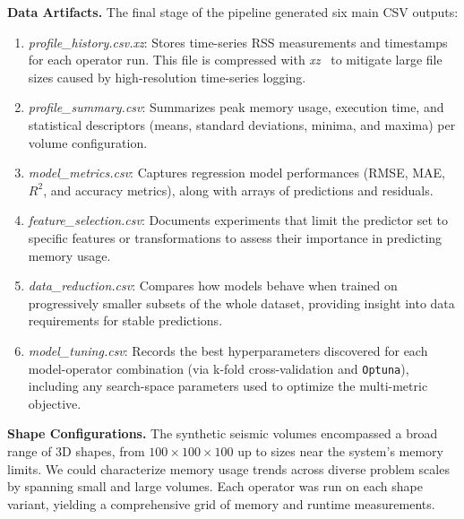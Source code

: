 \vspace{1em}
\noindent
\textbf{Data Artifacts.}
The final stage of the pipeline generated six main \ac{CSV} outputs:
\begin{enumerate}
    \item \emph{profile\_history.csv.xz}: Stores time-series \ac{RSS} measurements and timestamps for each operator run. This file is compressed with \emph{xz}~\cite{xz} to mitigate large file sizes caused by high-resolution time-series logging.
    \item \emph{profile\_summary.csv}: Summarizes peak memory usage, execution time, and statistical descriptors (means, standard deviations, minima, and maxima) per volume configuration.
    \item \emph{model\_metrics.csv}: Captures regression model performances (\ac{RMSE}, \ac{MAE}, $R^2$, and accuracy metrics), along with arrays of predictions and residuals.
    \item \emph{feature\_selection.csv}: Documents experiments that limit the predictor set to specific features or transformations to assess their importance in predicting memory usage.
    \item \emph{data\_reduction.csv}: Compares how models behave when trained on progressively smaller subsets of the whole dataset, providing insight into data requirements for stable predictions.
    \item \emph{model\_tuning.csv}: Records the best hyperparameters discovered for each model-operator combination (via k-fold cross-validation and \texttt{Optuna}), including any search-space parameters used to optimize the multi-metric objective.
\end{enumerate}

\vspace{1em}
\noindent
\textbf{Shape Configurations.}
The synthetic seismic volumes encompassed a broad range of \ac{3D} shapes, from $100 \times 100 \times 100$ up to sizes near the system's memory limits.
We could characterize memory usage trends across diverse problem scales by spanning small and large volumes.
Each operator was run on each shape variant, yielding a comprehensive grid of memory and runtime measurements.